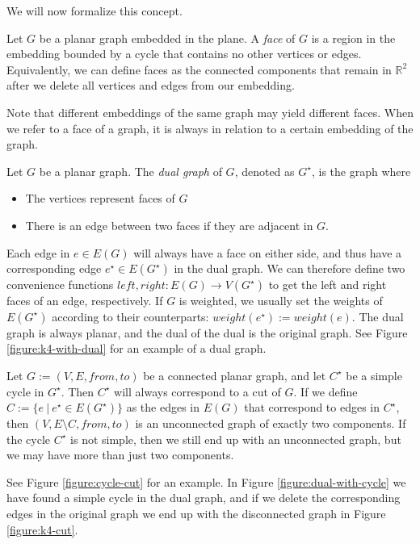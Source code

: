 We will now formalize this concept.

\begin{definition}[Face]
    Let $G$ be a planar graph embedded in the plane. A \emph{face} of $G$ is a region in the embedding bounded by a cycle that contains no other vertices or edges. Equivalently, we can define faces as the connected components that remain in $\mathbb{R}^2$ after we delete all vertices and edges from our embedding. 

    Note that different embeddings of the same graph may yield different faces. When we refer to a face of a graph, it is always in relation to a certain embedding of the graph.
\end{definition}

\begin{definition}
    Let $G$ be a planar graph. The \emph{dual graph} of $G$, denoted as $G^\star$, is the graph where 
    \begin{itemize}
        \item The vertices represent faces of $G$
        \item There is an edge between two faces if they are adjacent in $G$.
    \end{itemize}
\end{definition}

Each edge in $e \in E(G)$ will always have a face on either side, and thus have a corresponding edge $e^\star \in E(G^\star)$ in the dual graph. We can therefore define two convenience functions $left, right : E(G) \rightarrow V(G^\star)$ to get the left and right faces of an edge, respectively. If $G$ is weighted, we usually set the weights of $E(G^\star)$ according to their counterparts: $weight(e^\star) := weight(e)$. The dual graph is always planar, and the dual of the dual is the original graph. See Figure \ref{figure:k4-with-dual} for an example of a dual graph.

\begin{fact}
\label{fact:dual-cycle-is-real-cut}
    Let $G := (V, E, from, to)$ be a connected planar graph, and let $C^\star$ be a simple cycle in $G^\star$. Then $C^\star$ will always correspond to a cut of $G$. If we define $C := \{e ~ | ~ e^\star \in E(G^\star)\}$ as the edges in $E(G)$ that correspond to edges in $C^\star$, then $(V,E \setminus C, from, to)$ is an unconnected graph of exactly two components. If the cycle $C^\star$ is not simple, then we still end up with an unconnected graph, but we may have more than just two components.

    See Figure \ref{figure:cycle-cut} for an example. In Figure \ref{figure:dual-with-cycle} we have found a simple cycle in the dual graph, and if we delete the corresponding edges in the original graph we end up with the disconnected graph in Figure \ref{figure:k4-cut}.
\end{fact}

